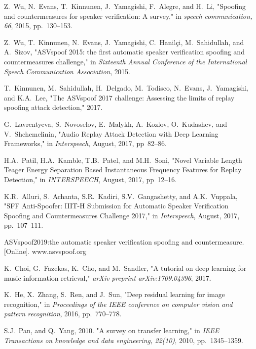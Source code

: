 \documentclass[a4paper]{article}
\begin{document}
\begin{thebibliography}{9}

Z.\ Wu,  N.\ Evans,  T.\ Kinnunen, J.\ Yamagishi, F.\ Alegre, and  H.\ Li,
"Spoofing and countermeasures for speaker verification: A survey,"
in \textit{speech communication, 66}, 2015, pp.~130--153.

Z.\ Wu,  T.\ Kinnunen, N.\ Evans, J.\ Yamagishi, C.\ Hanilçi, M.\ Sahidullah, and A.\ Sizov,
"ASVspoof 2015: the first automatic speaker verification spoofing and countermeasures challenge,"
in \textit{Sixteenth Annual Conference of the International Speech Communication Association}, 2015.

T.\ Kinnunen, M.\ Sahidullah, H.\ Delgado, M.\ Todisco, N.\ Evans, J.\ Yamagishi, and K.A.\ Lee,
"The ASVspoof 2017 challenge: Assessing the limits of replay spoofing attack detection," 2017.

G.\ Lavrentyeva, S.\ Novoselov, E.\ Malykh, A.\ Kozlov, O.\ Kudashev, and V.\ Shchemelinin,
"Audio Replay Attack Detection with Deep Learning Frameworks," in \textit{Interspeech}, August, 2017, pp~82--86.

H.A.\ Patil, H.A.\ Kamble, T.B.\ Patel, and M.H.\ Soni,
"Novel Variable Length Teager Energy Separation Based Instantaneous Frequency Features for Replay Detection,"
in \textit{INTERSPEECH}, August, 2017, pp~12--16.

K.R.\ Alluri, S.\ Achanta, S.R.\ Kadiri, S.V.\ Gangashetty, and A.K.\ Vuppala,
"SFF Anti-Spoofer: IIIT-H Submission for Automatic Speaker Verification Spoofing and Countermeasures Challenge 2017,"
in \textit{Interspeech}, August, 2017, pp.~107--111.

ASVspoof2019:the automatic speaker verification spoofing and countermeasure.[Online].
www.asvspoof.org

K.\ Choi, G.\ Fazekas, K.\ Cho, and M.\ Sandler,
"A tutorial on deep learning for music information retrieval," 
\textit{arXiv preprint arXiv:1709.04396}, 2017.

K.\ He, X.\ Zhang, S.\ Ren, and J.\ Sun,
 "Deep residual learning for image recognition,"
 in \textit{Proceedings of the IEEE conference on computer vision and pattern recognition}, 2016, pp.~770--778.
 
 S.J.\ Pan, and Q.\ Yang, 2010.
"A survey on transfer learning,"
in \textit{IEEE Transactions on knowledge and data engineering, 22(10)}, 2010, pp.~1345--1359.
 

\end{thebibliography}
\end{document}
